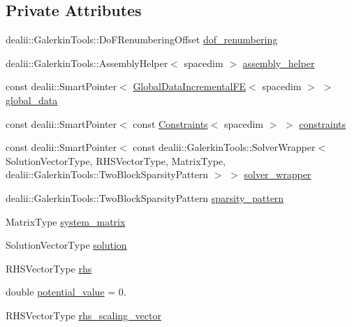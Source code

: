 \subsection*{Private Attributes}
\begin{DoxyCompactItemize}
\item 
dealii\+::\+Galerkin\+Tools\+::\+Do\+F\+Renumbering\+Offset \hyperlink{classincremental_f_e_1_1_f_e_model_ae3bd54f0440c5dcaf08066efd786c341}{dof\+\_\+renumbering}
\item 
dealii\+::\+Galerkin\+Tools\+::\+Assembly\+Helper$<$ spacedim $>$ \hyperlink{classincremental_f_e_1_1_f_e_model_a937ea806f50796c76a45f36e6ec3cd29}{assembly\+\_\+helper}
\item 
const dealii\+::\+Smart\+Pointer$<$ \hyperlink{classincremental_f_e_1_1_global_data_incremental_f_e}{Global\+Data\+Incremental\+FE}$<$ spacedim $>$ $>$ \hyperlink{classincremental_f_e_1_1_f_e_model_aa6f80778241b26906af1f571517102dd}{global\+\_\+data}
\item 
const dealii\+::\+Smart\+Pointer$<$ const \hyperlink{classincremental_f_e_1_1_constraints}{Constraints}$<$ spacedim $>$ $>$ \hyperlink{classincremental_f_e_1_1_f_e_model_a33a622c3c53ea4bee3bdefac06201c70}{constraints}
\item 
const dealii\+::\+Smart\+Pointer$<$ const dealii\+::\+Galerkin\+Tools\+::\+Solver\+Wrapper$<$ Solution\+Vector\+Type, R\+H\+S\+Vector\+Type, Matrix\+Type, dealii\+::\+Galerkin\+Tools\+::\+Two\+Block\+Sparsity\+Pattern $>$ $>$ \hyperlink{classincremental_f_e_1_1_f_e_model_a609de66ca9623d737bf3a45a37bb7690}{solver\+\_\+wrapper}
\item 
dealii\+::\+Galerkin\+Tools\+::\+Two\+Block\+Sparsity\+Pattern \hyperlink{classincremental_f_e_1_1_f_e_model_ac5c04f79916df3cc38ac64209051eecd}{sparsity\+\_\+pattern}
\item 
Matrix\+Type \hyperlink{classincremental_f_e_1_1_f_e_model_abc07b7d142d78230bcd55274f35514b3}{system\+\_\+matrix}
\item 
Solution\+Vector\+Type \hyperlink{classincremental_f_e_1_1_f_e_model_a02134975db38fcf4f7ce698d605baa30}{solution}
\item 
R\+H\+S\+Vector\+Type \hyperlink{classincremental_f_e_1_1_f_e_model_aba8e9e925aa72d2dd0f86c451b2cf3d6}{rhs}
\item 
double \hyperlink{classincremental_f_e_1_1_f_e_model_a04ea9240ef0084b44471a40f0d64ac54}{potential\+\_\+value} = 0.
\item 
R\+H\+S\+Vector\+Type \hyperlink{classincremental_f_e_1_1_f_e_model_a26ffe7f5ecf94f3bdbe27f4ea3e577dc}{rhs\+\_\+scaling\+\_\+vector}

\end{DoxyCompactItemize}
